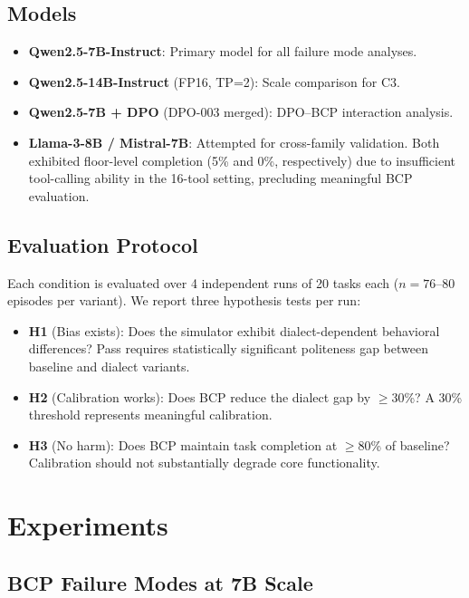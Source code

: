 \documentclass[11pt]{article}
\begin{document}
\subsection{Models}

\begin{itemize}
    \item \textbf{Qwen2.5-7B-Instruct}: Primary model for all failure mode analyses.
    \item \textbf{Qwen2.5-14B-Instruct} (FP16, TP=2): Scale comparison for C3.
    \item \textbf{Qwen2.5-7B + DPO} (DPO-003 merged): DPO--BCP interaction analysis.
    \item \textbf{Llama-3-8B / Mistral-7B}: Attempted for cross-family validation. Both exhibited floor-level completion (5\% and 0\%, respectively) due to insufficient tool-calling ability in the 16-tool setting, precluding meaningful BCP evaluation.
\end{itemize}

\subsection{Evaluation Protocol}

Each condition is evaluated over 4 independent runs of 20 tasks each ($n=76$--$80$ episodes per variant). We report three hypothesis tests per run:
\begin{itemize}
    \item \textbf{H1} (Bias exists): Does the simulator exhibit dialect-dependent behavioral differences? Pass requires statistically significant politeness gap between baseline and dialect variants.
    \item \textbf{H2} (Calibration works): Does BCP reduce the dialect gap by $\geq$30\%? A 30\% threshold represents meaningful calibration.
    \item \textbf{H3} (No harm): Does BCP maintain task completion at $\geq$80\% of baseline? Calibration should not substantially degrade core functionality.
\end{itemize}

\section{Experiments}

\subsection{BCP Failure Modes at 7B Scale}
\label{sec:bcp_7b}
\end{document}
